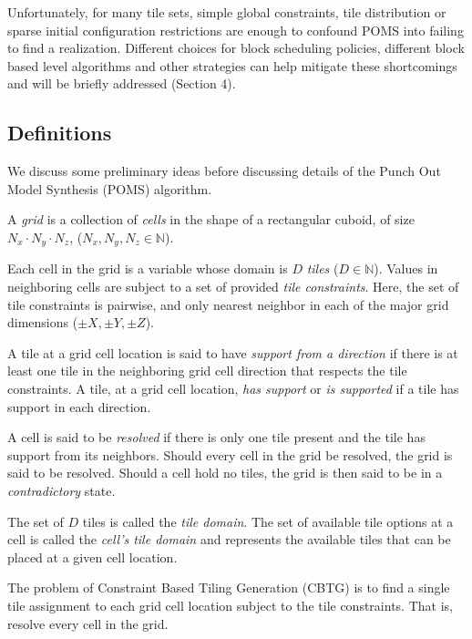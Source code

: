 Unfortunately, for many tile sets, simple global constraints, tile distribution or sparse initial configuration restrictions
are enough to
confound POMS into failing to find a realization.
Different choices for block scheduling policies, 
different block based level algorithms and other strategies
can help mitigate these shortcomings and will be briefly addressed (Section 4).


\subsection{Definitions}

We discuss some preliminary ideas before discussing details
of the Punch Out Model Synthesis (POMS) algorithm.

A \textit{grid} is a collection of \textit{cells} in the shape of a rectangular cuboid,
of size $N_x \cdot N_y \cdot N_z$, ($N_x, N_y, N_z \in \mathbb{N}$).

Each cell in the grid is a variable whose domain is $D$ \textit{tiles} ($D \in \mathbb{N}$).
Values in neighboring cells are subject to a set of provided \textit{tile constraints}.
%
%
Here, the set of tile constraints is pairwise, and only nearest neighbor in each of the major grid dimensions ($\pm X, \pm Y, \pm Z$).

A tile at a grid cell location is said to have \textit{support from a direction} if there is at least
one tile in the neighboring grid cell direction that respects the tile constraints.
A tile, at a grid cell location, \textit{has support} or \textit{is supported} if a tile has support in each direction.

A cell is said to be \textit{resolved} if there is only one tile present and the tile has support from its neighbors.
Should every cell in the grid be resolved, the grid is said to be resolved.
Should a cell hold no tiles, the grid is then said to be in a \textit{contradictory} state.

The set of $D$ tiles is called the \textit{tile domain}.
The set of available tile options at a cell is called the \textit{cell's tile domain} and represents the
available tiles that can be placed at a given cell location.


The problem of Constraint Based Tiling Generation (CBTG) is to
find a single tile assignment to each grid cell location subject to the tile constraints.
That is, resolve every cell in the grid.

